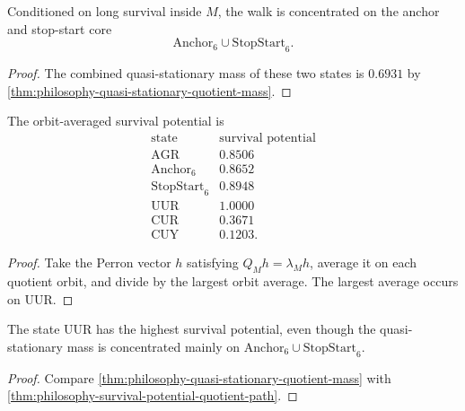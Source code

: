 \begin{corollary}
\label{cor:philosophy-quasi-stationary-core}
Conditioned on long survival inside $M$, the walk is concentrated on
the anchor and stop-start core
$$
  \mathrm{Anchor}_{6}\cup\mathrm{StopStart}_{6}.
$$
\end{corollary}
\begin{proof}
The combined quasi-stationary mass of these two states is $0.6931$ by
\autoref{thm:philosophy-quasi-stationary-quotient-mass}.
\end{proof}

\begin{theorem}
\label{thm:philosophy-survival-potential-quotient-path}
The orbit-averaged survival potential is
$$
\begin{array}{c|r}
  \text{state} & \text{survival potential}\\
  \hline
  \mathrm{AGR} & 0.8506\\
  \mathrm{Anchor}_{6} & 0.8652\\
  \mathrm{StopStart}_{6} & 0.8948\\
  \mathrm{UUR} & 1.0000\\
  \mathrm{CUR} & 0.3671\\
  \mathrm{CUY} & 0.1203.
\end{array}
$$
\end{theorem}
\begin{proof}
Take the Perron vector $h$ satisfying $Q_Mh=\lambda_Mh$, average it on
each quotient orbit, and divide by the largest orbit average. The largest
average occurs on $\mathrm{UUR}$.
\end{proof}

\begin{corollary}
\label{cor:philosophy-uur-survival-bridge}
The state $\mathrm{UUR}$ has the highest survival potential, even though
the quasi-stationary mass is concentrated mainly on
$\mathrm{Anchor}_{6}\cup\mathrm{StopStart}_{6}$.
\end{corollary}
\begin{proof}
Compare \autoref{thm:philosophy-quasi-stationary-quotient-mass} with
\autoref{thm:philosophy-survival-potential-quotient-path}.
\end{proof}

